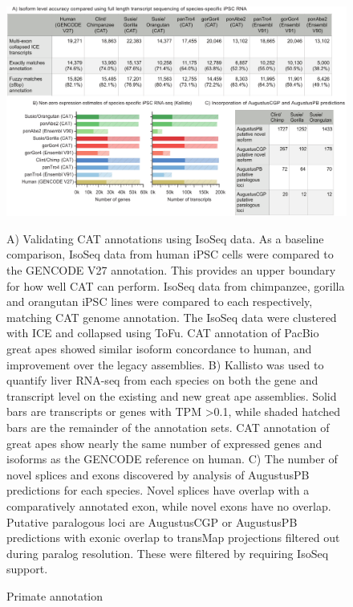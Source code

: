 \documentclass[fleqn,10pt]{wlscirep}
\begin{document}
\begin{figure}
\centering
\includegraphics[width=\textwidth,height=\textheight,keepaspectratio]{figure2-primate_v6.pdf}
\caption{Primate annotation}
A) Validating CAT annotations using IsoSeq data. As a baseline comparison, IsoSeq data from human iPSC cells were compared to the GENCODE V27 annotation. This provides an upper boundary for how well CAT can perform. IsoSeq data from chimpanzee,  gorilla and orangutan iPSC lines were compared to each respectively, matching CAT genome annotation.  The IsoSeq data were clustered with ICE and collapsed using ToFu\cite{gordon2015widespread}. CAT annotation of PacBio great apes showed similar isoform concordance to human, and improvement over the legacy assemblies. B) Kallisto\cite{bray2015near} was used to quantify liver RNA-seq from each species on both the gene and transcript level on the existing and new great ape assemblies. Solid bars are transcripts or genes with TPM \textgreater 0.1, while shaded hatched bars are the remainder of the annotation sets. CAT annotation of great apes show nearly the same number of expressed genes and isoforms as the GENCODE reference on human. C) The number of novel splices and exons discovered by analysis of AugustusPB predictions for each species. Novel splices have overlap with a comparatively annotated exon, while novel exons have no overlap. Putative paralogous loci are AugustusCGP or AugustusPB predictions with exonic overlap to transMap projections filtered out during paralog resolution. These were filtered by requiring IsoSeq support.
\label{fig:fig2}
\end{figure}
\end{document}
